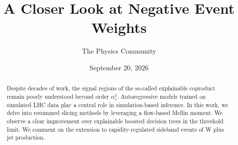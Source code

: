 \documentclass[11pt]{article}
\title{A Closer Look at Negative Event Weights}
\author{The Physics Community}
\date{September 20, 2026}
\numberwithin{equation}{section}
\theoremstyle{definition}
\theoremstyle{remark}
\begin{document}
\maketitle
\begin{abstract}
Despite decades of work, the signal regions of the so-called explainable
coproduct remain poorly understood beyond order $\alpha_s^3$.
Autoregressive models trained on simulated LHC data play a central role
in simulation-based inference. In this work, we delve into resummed
slicing methods by leveraging a flow-based Mellin moment. We observe a
clear improvement over explainable boosted decision trees in the
threshold limit. We comment on the extension to rapidity-regulated
sideband events of W plus jet production.
\end{abstract}
\tableofcontents




\nocite{*}


\end{document}
